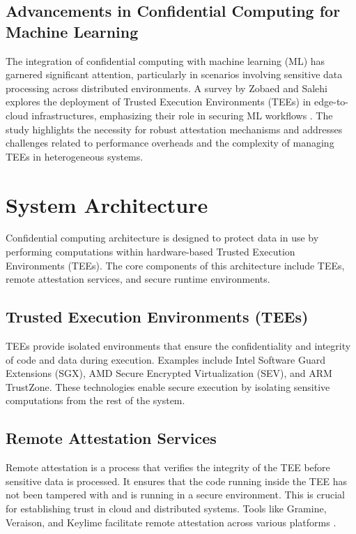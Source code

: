 \documentclass[conference]{IEEEtran}
\begin{document}
\subsection{Advancements in Confidential Computing for Machine Learning}
The integration of confidential computing with machine learning (ML) has garnered significant 
attention, particularly in scenarios involving sensitive data processing across distributed 
environments. A survey by Zobaed and Salehi explores the deployment of Trusted Execution 
Environments (TEEs) in edge-to-cloud infrastructures, emphasizing their role in securing ML 
workflows \cite{machine_learning}. The study highlights the necessity for robust attestation 
mechanisms and addresses 
challenges related to performance overheads and the complexity of managing TEEs in heterogeneous 
systems.

\section{System Architecture}
Confidential computing architecture is designed to protect data in use by performing computations 
within hardware-based Trusted Execution Environments (TEEs). The core components of this 
architecture include TEEs, remote attestation services, and secure runtime environments.

\subsection{Trusted Execution Environments (TEEs)}
TEEs provide isolated environments that ensure the confidentiality and integrity of code and 
data during execution. Examples include Intel Software Guard Extensions (SGX), AMD Secure Encrypted 
Virtualization (SEV), and ARM TrustZone. These technologies enable secure execution by isolating 
sensitive computations from the rest of the system.

\subsection{Remote Attestation Services}
Remote attestation is a process that verifies the integrity of the TEE before 
sensitive data is processed. It ensures that the code running inside the TEE has not been 
tampered with and is running in a secure environment. This is crucial for establishing trust in 
cloud and distributed systems. Tools like Gramine, Veraison, and Keylime facilitate remote 
attestation across various platforms \cite{remote_attestation}. 
\end{document}
